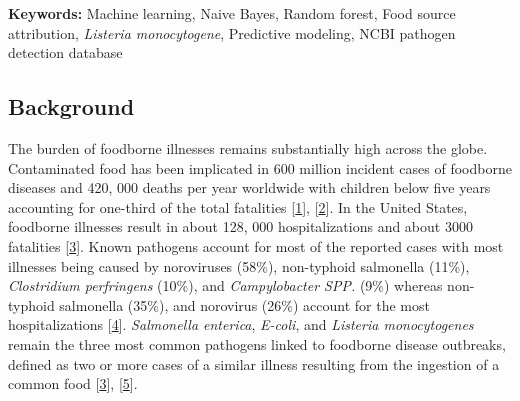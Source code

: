 \documentclass[
  10pt,
]{article}
\providecommand{\keywords}[1]{\textbf{Keywords:} #1}
\begin{document}
\singlespacing
\hspace{15pt} \keywords{Machine learning, Naive Bayes, Random forest, Food source attribution, \textit{Listeria monocytogene}, Predictive modeling, NCBI pathogen detection database}

\hypertarget{background}{%
\subsection{Background}\label{background}}

The burden of foodborne illnesses remains substantially high across the globe. Contaminated food has been implicated in 600 million incident cases of foodborne diseases and 420, 000 deaths per year worldwide with children below five years accounting for one-third of the total fatalities {[}\protect\hyperlink{ref-who2015}{1}{]}, {[}\protect\hyperlink{ref-Lee2021}{2}{]}. In the United States, foodborne illnesses result in about 128, 000 hospitalizations and about 3000 fatalities {[}\protect\hyperlink{ref-tanui2022machine}{3}{]}. Known pathogens account for most of the reported cases with most illnesses being caused by noroviruses (58\%), non-typhoid salmonella (11\%), \emph{Clostridium perfringens} (10\%), and \emph{Campylobacter SPP.} (9\%) whereas non-typhoid salmonella (35\%), and norovirus (26\%) account for the most hospitalizations {[}\protect\hyperlink{ref-Scallan2011}{4}{]}. \emph{Salmonella enterica}, \emph{E-coli}, and \emph{Listeria monocytogenes} remain the three most common pathogens linked to foodborne disease outbreaks, defined as two or more cases of a similar illness resulting from the ingestion of a common food {[}\protect\hyperlink{ref-tanui2022machine}{3}{]}, {[}\protect\hyperlink{ref-gourama2020foodborne}{5}{]}.
\end{document}
